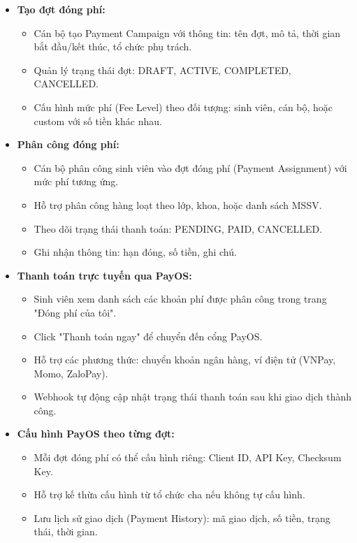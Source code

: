 \begin{itemize}
    \item \textbf{Tạo đợt đóng phí:}
    \begin{itemize}
        \item Cán bộ tạo Payment Campaign với thông tin: tên đợt, mô tả, thời gian bắt đầu/kết thúc, tổ chức phụ trách.
        \item Quản lý trạng thái đợt: DRAFT, ACTIVE, COMPLETED, CANCELLED.
        \item Cấu hình mức phí (Fee Level) theo đối tượng: sinh viên, cán bộ, hoặc custom với số tiền khác nhau.
    \end{itemize}
    
    \item \textbf{Phân công đóng phí:}
    \begin{itemize}
        \item Cán bộ phân công sinh viên vào đợt đóng phí (Payment Assignment) với mức phí tương ứng.
        \item Hỗ trợ phân công hàng loạt theo lớp, khoa, hoặc danh sách MSSV.
        \item Theo dõi trạng thái thanh toán: PENDING, PAID, CANCELLED.
        \item Ghi nhận thông tin: hạn đóng, số tiền, ghi chú.
    \end{itemize}
    
    \item \textbf{Thanh toán trực tuyến qua PayOS:}
    \begin{itemize}
        \item Sinh viên xem danh sách các khoản phí được phân công trong trang "Đóng phí của tôi".
        \item Click "Thanh toán ngay" để chuyển đến cổng PayOS.
        \item Hỗ trợ các phương thức: chuyển khoản ngân hàng, ví điện tử (VNPay, Momo, ZaloPay).
        \item Webhook tự động cập nhật trạng thái thanh toán sau khi giao dịch thành công.
    \end{itemize}
    
    \item \textbf{Cấu hình PayOS theo từng đợt:}
    \begin{itemize}
        \item Mỗi đợt đóng phí có thể cấu hình riêng: Client ID, API Key, Checksum Key.
        \item Hỗ trợ kế thừa cấu hình từ tổ chức cha nếu không tự cấu hình.
        \item Lưu lịch sử giao dịch (Payment History): mã giao dịch, số tiền, trạng thái, thời gian.
    \end{itemize}
    

\end{itemize}
